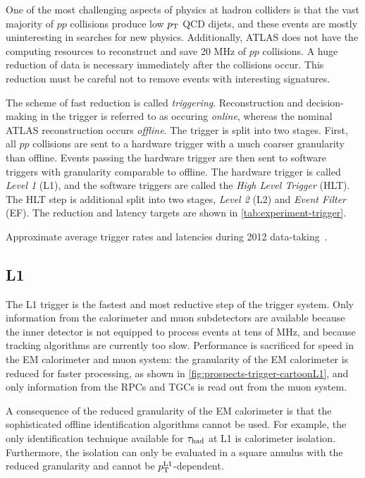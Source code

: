 One of the most challenging aspects of physics at hadron colliders is that the vast majority of $pp$ collisions produce low $p_{\mathrm{T}}$ QCD dijets, and these events are mostly uninteresting in searches for new physics. Additionally, ATLAS does not have the computing resources to reconstruct and save 20 MHz of $pp$ collisions. A huge reduction of data is necessary immediately after the collisions occur. This reduction must be careful not to remove events with interesting signatures.

The scheme of fast reduction is called \textit{triggering}. Reconstruction and decision-making in the trigger is referred to as occuring \textit{online}, whereas the nominal ATLAS reconstruction occurs \textit{offline}. The trigger is split into two stages. First, all $pp$ collisions are sent to a hardware trigger with a much coarser granularity than offline. Events passing the hardware trigger are then sent to software triggers with granularity comparable to offline. The hardware trigger is called \textit{Level 1} (L1), and the software triggers are called the \textit{High Level Trigger} (HLT). The HLT step is additional split into two stages, \textit{Level 2} (L2) and \textit{Event Filter} (EF). The reduction and latency targets are shown in \cref{tab:experiment-trigger}.

\begin{table}[bp]
  \centering
  \renewcommand{\arraystretch}{1.4}
  \caption{Approximate average trigger rates and latencies during 2012 data-taking~\cite{cern-jinst-atlas,TRIG-2012-03,TriggerOperationPublicResults}.}
  
  \label{tab:experiment-trigger}
\end{table}

\subsection{L1}

The L1 trigger is the fastest and most reductive step of the trigger system. Only information from the calorimeter and muon subdetectors are available because the inner detector is not equipped to process events at tens of MHz, and because tracking algorithms are currently too slow. Performance is sacrificed for speed in the EM calorimeter and muon system: the granularity of the EM calorimeter is reduced for faster processing, as shown in \cref{fig:prospects-trigger-cartoonL1}, and only information from the RPCs and TGCs is read out from the muon system.

A consequence of the reduced granularity of the EM calorimeter is that the sophisticated offline identification algorithms cannot be used. For example, the only identification technique available for $\tau_\text{had}$ at L1 is calorimeter isolation. Furthermore, the isolation can only be evaluated in a square annulus with the reduced granularity and cannot be $p_{\mathrm{T}}^\text{L1}$-dependent.

